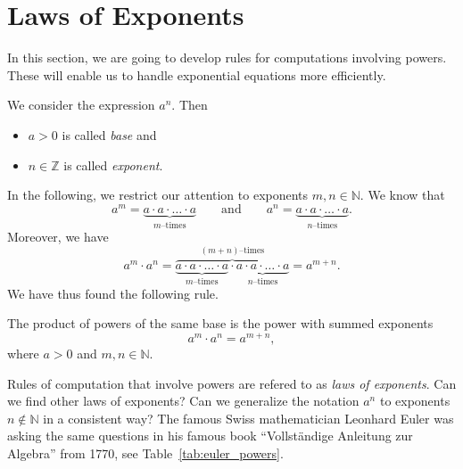 \section*{Laws of Exponents}
In this section, we are going to develop rules for computations involving powers.
These will enable us to handle exponential equations more efficiently.
\begin{tcolorbox}
	We consider the expression $a^n$. Then
	\begin{itemize}
		\item $a>0$ is called \textit{base} and
		\item $n\in\mathbb Z$ is called \textit{exponent}.
	\end{itemize}
\end{tcolorbox}
In the following, we restrict our attention to exponents $m,n\in\mathbb N$.
We know that
\begin{equation*}
	a^m=\underbrace{a\cdot a\cdot\ldots\cdot a}_{m\text{--times}}
	\qquad\text{and}\qquad
	a^n=\underbrace{a\cdot a\cdot\ldots\cdot a}_{n\text{--times}}.
\end{equation*}
Moreover, we have
\begin{equation*}
	a^m\cdot a^n
	=\overbrace{\underbrace{a\cdot a\cdot\ldots\cdot a}_{m\text{--times}}
	\cdot\underbrace{a\cdot a\cdot\ldots\cdot a}_{n\text{--times}}}^{(m+n)\text{--times}}
	=a^{m+n}.
\end{equation*}
We have thus found the following rule.
\begin{tcolorbox}
	The product of powers of the same base is the power with summed exponents
	\begin{equation*}
		a^m\cdot a^n=a^{m+n},
	\end{equation*}
	where $a>0$ and $m,n\in\mathbb N$.
\end{tcolorbox}
Rules of computation that involve powers are refered to as \textit{laws of exponents}.
Can we find other laws of exponents? Can we generalize the notation $a^n$ to exponents $n\notin\mathbb N$ in a consistent way?
The famous Swiss mathematician Leonhard Euler was asking the same questions in his famous book ``Vollständige Anleitung zur Algebra'' from 1770, see Table~\ref{tab:euler_powers}.
